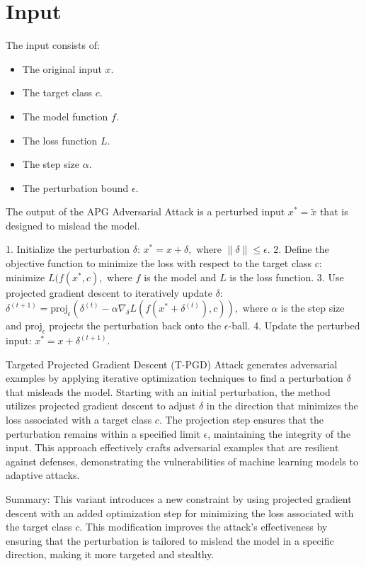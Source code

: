 \section*{Input}
The input consists of:
\begin{itemize}
    \item The original input $x$.
    \item The target class $c$.
    \item The model function $f$.
    \item The loss function $L$.
    \item The step size $\alpha$.
    \item The perturbation bound $\epsilon$.
\end{itemize}

The output of the APG Adversarial Attack is a perturbed input $x^* = \tilde{x}$ that is designed to mislead the model.

1. Initialize the perturbation $\delta$:
   $
   x^* = x + \delta,
   $
   where $\|\delta\| \leq \epsilon$.
2. Define the objective function to minimize the loss with respect to the target class $c$:
   $
   \text{minimize } L(f(x^*, c),
   $
   where $f$ is the model and $L$ is the loss function.
3. Use projected gradient descent to iteratively update $\delta$:
   $
   \delta^{(t+1)} = \text{proj}_{\epsilon} \left( \delta^{(t)} - \alpha \nabla_{\delta} L(f(x^* + \delta^{(t)}), c) \right),
   $
   where $\alpha$ is the step size and $\text{proj}_{\epsilon}$ projects the perturbation back onto the $\epsilon$-ball.
4. Update the perturbed input:
   $
   x^* = x + \delta^{(t+1)}.
   $

 Targeted Projected Gradient Descent (T-PGD) Attack generates adversarial examples by applying iterative optimization techniques to find a perturbation $\delta$ that misleads the model. Starting with an initial perturbation, the method utilizes projected gradient descent to adjust $\delta$ in the direction that minimizes the loss associated with a target class $c$. The projection step ensures that the perturbation remains within a specified limit $\epsilon$, maintaining the integrity of the input. This approach effectively crafts adversarial examples that are resilient against defenses, demonstrating the vulnerabilities of machine learning models to adaptive attacks.

Summary: This variant introduces a new constraint by using projected gradient descent with an added optimization step for minimizing the loss associated with the target class $c$. This modification improves the attack's effectiveness by ensuring that the perturbation is tailored to mislead the model in a specific direction, making it more targeted and stealthy.